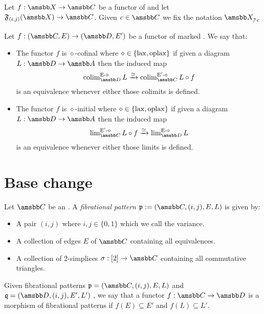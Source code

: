 \documentclass[10pt,a4paper]{amsart}
\begin{document}
 \begin{defn}
   Let $f:\tX \to \tC$ be a functor of \itcats{} and let $\mathfrak{F}_{(i,j)}(\tX) \to \tC$. Given $c \in \tC$ we fix the notation $\tX_{\upslash c}$
 \end{defn}

 \begin{defn}
   Let $f:(\tC,E) \to (\tD,E')$ be a functor of marked \itcats{}. We say that:
   \begin{itemize}
     \item The functor $f$ is $\diamond$-cofinal where $\diamond \in \{\text{\textup{lax}},\text{\textup{oplax}}\}$ if given a diagram $L:\tD \to \tA$ then the induced map
     \[
       \colim_{\tD}^{\text{E}\text{-}\diamond} L \xrightarrow{\simeq} \colim_{\tC}^{\text{E}'\text{-}\diamond} L \circ f
     \]
     is an equivalence whenever either those colimits is defined.
     \item  The functor $f$ is $\diamond$-initial where $\diamond \in \{\text{\textup{lax}},\text{\textup{oplax}}\}$ if given a diagram $L:\tD \to \tA$ then the induced map 
     \[
       \lim_{\tC}^{\text{E}'\text{-}\diamond} L \circ f \xrightarrow{\simeq} \lim_{\tD}^{\text{E}\text{-}\diamond} L
     \]
     is an equivalence whenever either those limits is defined.
   \end{itemize}
 \end{defn}




 \section{Base change}
 \begin{defn}\label{def:fibpattern}
   Let $\tC$ be an \itcat{ }. A \emph{fibrational pattern} $\mathfrak{p}:=(\tC,(i,j),E,L)$ is given by:
   \begin{itemize}
     \item A pair $(i,j)$ where $i,j \in \{0,1\}$ which we call the variance.
     \item A collection of edges $E$ of $\tC$ containing all equivalences.
     \item A collection of 2-simplices $\sigma: [2]  \to \tC$ containing all commutative triangles. 
   \end{itemize}
   Given fibrational patterns $\mathfrak{p}=(\tC,(i,j),E,L)$ and $\mathfrak{q}=(\tD,(i,j),E',L')$ , we say that a functor $f: \tC \to \tD$ is a morphism of fibrational patterns if $f(E)\subseteq E'$ and $f(L)\subseteq L'$.
 \end{defn}
\end{document}
